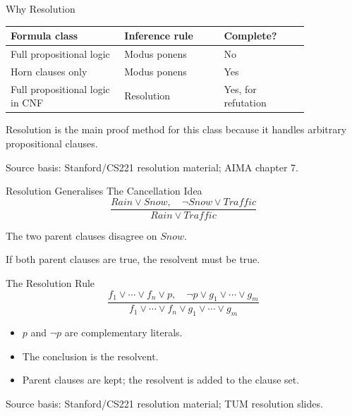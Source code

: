\documentclass[aspectratio=169,11pt]{beamer}
\newcommand{\source}[1]{\vfill{\scriptsize\color{darkgrey}Source basis: #1}}
\begin{document}
\begin{frame}{Why Resolution}
  \begin{center}
    \small
    \begin{tabular}{p{0.32\linewidth}p{0.28\linewidth}p{0.24\linewidth}}
      \toprule
      Formula class & Inference rule & Complete? \\
      \midrule
      Full propositional logic & Modus ponens & No \\
      Horn clauses only & Modus ponens & Yes \\
      Full propositional logic in CNF & Resolution & Yes, for refutation \\
      \bottomrule
    \end{tabular}
  \end{center}

  \vspace{0.8em}
  Resolution is the main proof method for this class because it handles arbitrary propositional clauses.

  \source{Stanford/CS221 resolution material; AIMA chapter 7.}
\end{frame}

\begin{frame}{Resolution Generalises The Cancellation Idea}
  \[
    \frac{Rain \lor Snow,\quad \neg Snow \lor Traffic}{Rain \lor Traffic}
  \]

  \vspace{0.5em}
  The two parent clauses disagree on $Snow$.

  \begin{center}
  \end{center}

  If both parent clauses are true, the resolvent must be true.
\end{frame}

\begin{frame}{The Resolution Rule}
  \[
    \frac{f_1 \lor \cdots \lor f_n \lor p,\quad
      \neg p \lor g_1 \lor \cdots \lor g_m}
    {f_1 \lor \cdots \lor f_n \lor g_1 \lor \cdots \lor g_m}
  \]

  \begin{itemize}
    \item $p$ and $\neg p$ are complementary literals.
    \item The conclusion is the resolvent.
    \item Parent clauses are kept; the resolvent is added to the clause set.
  \end{itemize}

  \source{Stanford/CS221 resolution material; TUM resolution slides.}
\end{frame}
\end{document}

